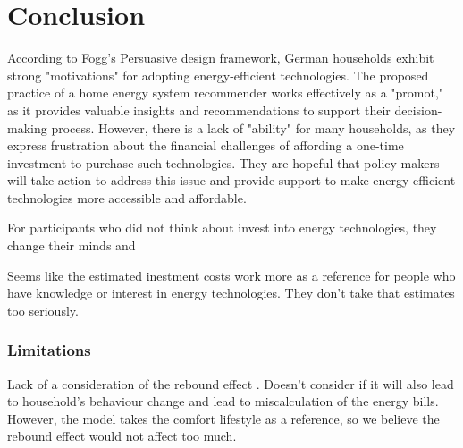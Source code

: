 \chapter{Conclusion}

According to Fogg's Persuasive design framework, 
German households exhibit strong "motivations" for adopting energy-efficient technologies. 
The proposed practice of a home energy system recommender works effectively as a "promot," as it provides valuable insights and recommendations to support their decision-making process. 
However, there is a lack of "ability" for many households, 
as they express frustration about the financial challenges of affording a one-time investment to purchase such technologies. 
They are hopeful that policy makers will take action to address this issue and provide support to make energy-efficient technologies more accessible and affordable.

For participants who did not think about invest into energy technologies,
they change their minds and 

Seems like the estimated inestment costs work more as a reference for people who have knowledge or interest in energy technologies. 
They don't take that estimates too seriously. 


\subsection{Limitations}

Lack of a consideration of the rebound effect \cite{Herring2007}. 
Doesn't consider if it will also lead to household's behaviour change and lead to miscalculation of the energy bills. 
However, the model takes the comfort lifestyle as a reference, so we believe the rebound effect would not affect too much. 

